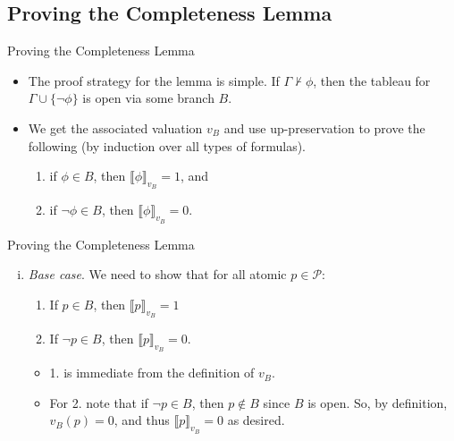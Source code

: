 \subsection{Proving the Completeness Lemma}
\begin{frame}{Proving the Completeness Lemma}

\begin{itemize}
\itemsep=16pt
		
	\item The proof strategy for the lemma is simple. 
	If $\Gamma\nvdash\phi$, then the tableau for $\Gamma\cup\{\neg\phi\}$ is open via some branch $B$.
				
	\item We get the associated valuation $v_B$ and use up-preservation to prove the following (by induction over all types of formulas).
	\begin{enumerate}[1.]
		\item if $\phi\in B$, then $\llbracket\phi\rrbracket_{v_B}=1$, and 
		\item if $\neg \phi\in B$, then $\llbracket\phi\rrbracket_{v_B}=0$.
	
	\end{enumerate}

\end{itemize}	

\end{frame}

\begin{frame}{Proving the Completeness Lemma}

\begin{enumerate}[(i)]
\itemsep=16pt
	
\item \emph{Base case}. We need to show that for all atomic $p\in \mathcal{P}$:
	\begin{enumerate}[1.]
	 	\item If $p\in B$, then $\llbracket p\rrbracket_{v_B}=1$
		\item If $\neg p\in B$, then $\llbracket p\rrbracket_{v_B}=0$.
	\end{enumerate}

	\bigskip
	
	\begin{itemize}
	\itemsep=16pt

		\item 1. is immediate from the definition of $v_B$. 
		
		\item For 2. note that if $\neg p\in B$, then $p\notin B$ since $B$ is open. So, by definition, $v_B(p)=0$, and thus $\llbracket p\rrbracket_{v_B}=0$ as desired.
		
		\end{itemize}
		
\end{enumerate}

\end{frame}

